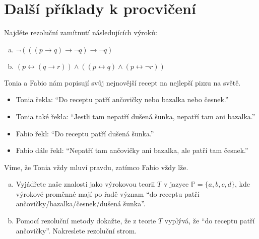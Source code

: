 \documentclass[a4paper,11pt]{amsart}
\begin{document}
        
\section*{Další příklady k procvičení}
        

\begin{problem}
    
    Najděte rezoluční zamítnutí následujících výroků:
    \begin{enumerate}[(a)]
        \item $\neg(((p\to q)\to \neg q)\to \neg q)$
        \item $(p\leftrightarrow (q\to r))\wedge((p\leftrightarrow q)\wedge(p\leftrightarrow \neg r))$        
    \end{enumerate}
\end{problem}


\begin{problem}

    Tonia a Fabio nám popisují svůj nejnovější recept na nejlepší pizzu na světě.
    \begin{itemize}
        \item Tonia řekla: ``Do receptu patří ančovičky nebo bazalka nebo česnek.''
        \item Tonia také řekla: ``Jestli tam nepatří dušená šunka, nepatří tam ani bazalka.''
        \item Fabio řekl: ``Do receptu patří dušená šunka.'' 
        \item Fabio dále řekl: ``Nepatří tam ančovičky ani bazalka, ale patří tam česnek.''
    \end{itemize}
    Víme, že Tonia vždy mluví pravdu, zatímco Fabio vždy lže.

    \begin{enumerate}[(a)]
        \item Vyjádřete naše znalosti jako výrokovou teorii $T$ v jazyce $\mathbb P=\{a,b,c,d\}$, kde výrokové proměnné mají po řadě význam ``do receptu patří ančovičky/bazalka/česnek/dušená šunka''.
        \item Pomocí rezoluční metody dokažte, že z teorie $T$ vyplývá, že ``do receptu patří ančovičky''. Nakreslete rezoluční strom.
    \end{enumerate}

\end{problem}
\end{document}
